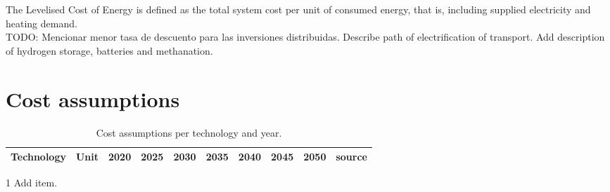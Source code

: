 \documentclass[3p]{elsarticle} %
\begin{document}
The Levelised Cost of Energy is defined as the total system cost per unit of consumed energy, that is, including supplied electricity and heating demand. \\

\textcolor[rgb]{1,0,0}{TODO:  
Mencionar menor tasa de descuento para las inversiones distribuidas.
Describe path of electrification of transport.
Add description of hydrogen storage, batteries and methanation. }




\section{Cost assumptions}	

\begin{table}[!b]
\footnotesize
\centering
\begin{threeparttable}
\caption{Cost assumptions per technology and year.} \label{tab:cost per year}
\centering
\begin{tabularx}{\textwidth}{lccccccccr}
\toprule

Technology\tnote{1}& Unit & 2020&2025&2030&2035&2040&2045&2050&source\\
\midrule



\bottomrule
\end{tabularx}
\begin{tablenotes}
\item[1] Add item.
\end{tablenotes}
\end{threeparttable}
\end{table}
\end{document}
